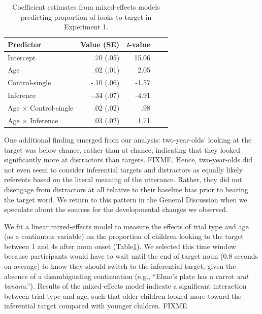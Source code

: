 \documentclass[10pt,letterpaper]{article}
\begin{document}
\begin{table}[b!]
\caption{\label{tab:lmer1}  Coefficient estimates from mixed-effects models predicting proportion of looks to target in Experiment 1.} 
\begin{center} 
\begin{tabular}{l r r r l} 
\hline
Predictor  &  Value (SE) & \emph{t}-value\\
\hline
Intercept  & .70 (.05) & 15.06 \\
Age & .02 (.01) &  2.05 \\
Control-single & -.10 (.06) & -1.57 \\
Inference & -.34 (.07) & -4.91 \\
Age $\times$ Control-single & .02 (.02) & .98 \\
Age $\times$ Inference & .03 (.02) & 1.71 \\
\hline
\end{tabular} 
\end{center} 
\end{table}

One additional finding emerged from our analysis: two-year-olds' looking at the target was below chance, rather than at chance, indicating that they looked significantly more at distractors than targets. FIXME. Hence, two-year-olds did not even seem to consider inferential targets and distractors as equally likely referents based on the literal meaning of the utterance. Rather, they did not disengage from distractors at all relative to their baseline bias prior to hearing the target word. We return to this pattern in the General Discussion when we speculate about the sources for the developmental changes we observed. %


We fit a linear mixed-effects model to measure the effects of trial type and age (as a continuous variable) on the proportion of children looking to the target between 1 and 4s after noun onset (Table\ref{tab:lmer1}). We selected this time window because participants would have to wait until the end of target noun (0.8 seconds on average) to know they should switch to the inferential target, given the absence of a disambiguating continuation (e.g., ``Elmo's plate has a carrot \emph{and banana}.''). Results of the mixed-effects model indicate a significant interaction between trial type and age, such that older children looked more toward the inferential target compared with younger children. FIXME %
\end{document}
